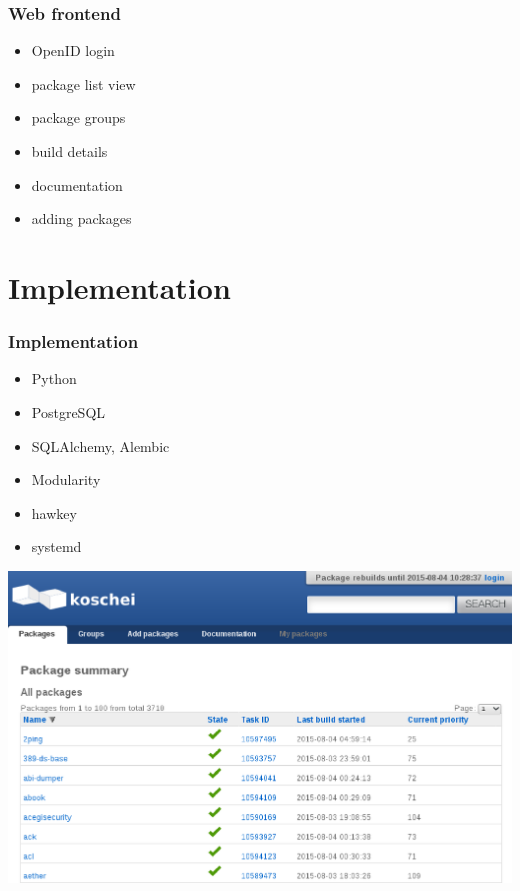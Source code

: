 \documentclass[pdftex,unicode,xcolor=table]{beamer}
\begin{document}
\begin{frame}
  \frametitle{Web frontend}
  \begin{itemize}
    \item OpenID login
    \item package list view
    \item package groups
    \item build details
    \item documentation
    \item adding packages
  \end{itemize}
\end{frame}

\section{Implementation}
\begin{frame}
  \frametitle{Implementation}
  \begin{itemize}
    \item Python
    \item PostgreSQL
    \item SQLAlchemy, Alembic
    \item Modularity
    \item hawkey
    \item systemd
  \end{itemize}
\end{frame}

\begin{frame}[fragile]
  \begin{center}
    \includegraphics[scale=0.48]{koschei-frontend-1.eps}
  \end{center}
\end{frame}
\end{document}

